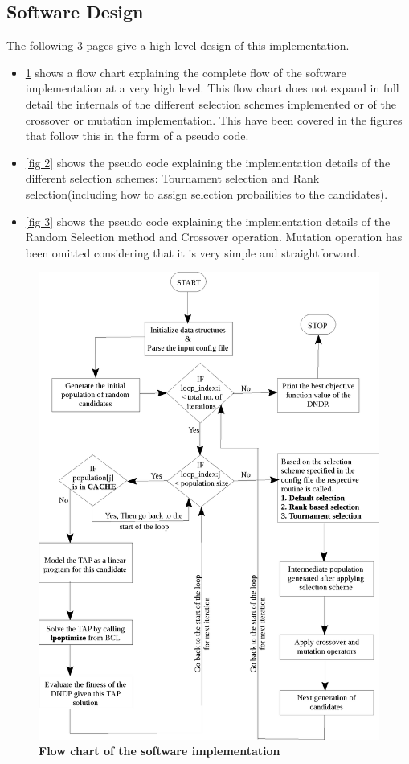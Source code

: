 \documentclass[a4paper, 12pt]{article}
\begin{document}
\subsection{Software Design}
The following 3 pages give a high level design of this implementation.
\begin{itemize}
\item \ref{fig 1} shows a flow chart explaining the complete flow of the software implementation at a very high level. This flow chart does not expand in full detail the internals of the different selection schemes implemented or of the crossover or mutation implementation. This have been covered in the figures that follow this in the form of a pseudo code.
\item \ref{fig 2} shows the pseudo code explaining the implementation details of the different selection schemes: Tournament selection and Rank selection(including how to assign selection probailities to the candidates).
\item \ref{fig 3} shows the pseudo code explaining the implementation details of the Random Selection method and Crossover operation. Mutation operation has been omitted considering that it is very simple and straightforward.
\end{itemize}
\begin{figure}[htbp]
\hspace*{-0.45in}
\includegraphics[scale=0.65]{./diagram.eps}%
\caption{\textbf{Flow chart of the software implementation}}
\label{fig 1}
\end{figure}
\end{document}
